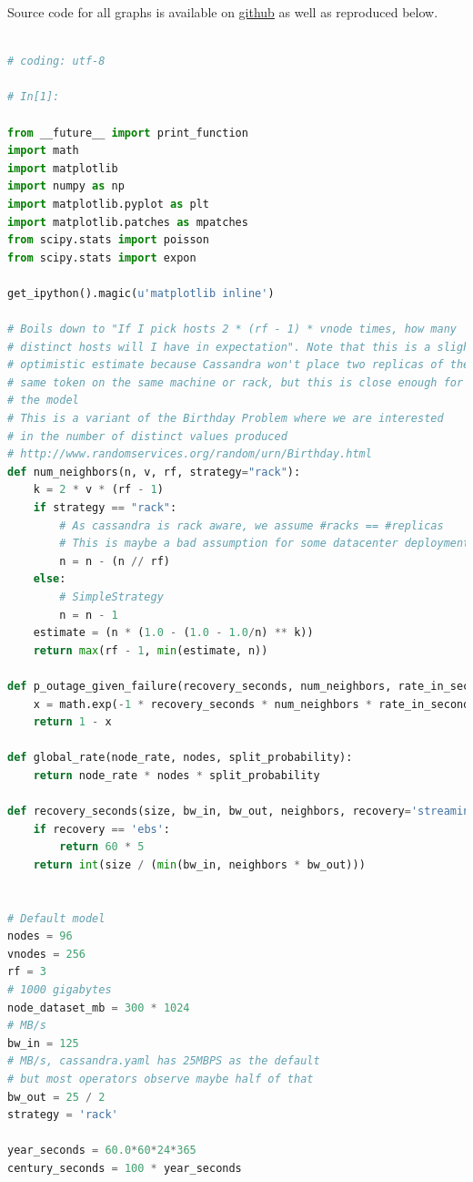 \documentclass{article}
\begin{document}
Source code for all graphs is available on \href{https://github.com/jolynch/python_performance_toolkit/blob/master/notebooks/cassandra_availability/cassandra_availability.ipynb}{github} as well as reproduced below.
\begin{lstlisting}[language=Python]

# coding: utf-8

# In[1]:

from __future__ import print_function
import math
import matplotlib
import numpy as np
import matplotlib.pyplot as plt
import matplotlib.patches as mpatches
from scipy.stats import poisson
from scipy.stats import expon

get_ipython().magic(u'matplotlib inline')

# Boils down to "If I pick hosts 2 * (rf - 1) * vnode times, how many
# distinct hosts will I have in expectation". Note that this is a slightly
# optimistic estimate because Cassandra won't place two replicas of the
# same token on the same machine or rack, but this is close enough for
# the model
# This is a variant of the Birthday Problem where we are interested
# in the number of distinct values produced
# http://www.randomservices.org/random/urn/Birthday.html
def num_neighbors(n, v, rf, strategy="rack"):
    k = 2 * v * (rf - 1)
    if strategy == "rack":
        # As cassandra is rack aware, we assume #racks == #replicas
        # This is maybe a bad assumption for some datacenter deployments
        n = n - (n // rf)
    else:
        # SimpleStrategy
        n = n - 1
    estimate = (n * (1.0 - (1.0 - 1.0/n) ** k))
    return max(rf - 1, min(estimate, n))

def p_outage_given_failure(recovery_seconds, num_neighbors, rate_in_seconds):
    x = math.exp(-1 * recovery_seconds * num_neighbors * rate_in_seconds)
    return 1 - x

def global_rate(node_rate, nodes, split_probability):
    return node_rate * nodes * split_probability

def recovery_seconds(size, bw_in, bw_out, neighbors, recovery='streaming'):
    if recovery == 'ebs':
        return 60 * 5
    return int(size / (min(bw_in, neighbors * bw_out)))


# Default model
nodes = 96
vnodes = 256
rf = 3
# 1000 gigabytes
node_dataset_mb = 300 * 1024
# MB/s
bw_in = 125
# MB/s, cassandra.yaml has 25MBPS as the default
# but most operators observe maybe half of that
bw_out = 25 / 2
strategy = 'rack'

year_seconds = 60.0*60*24*365
century_seconds = 100 * year_seconds


\end{lstlisting}
\end{document}
